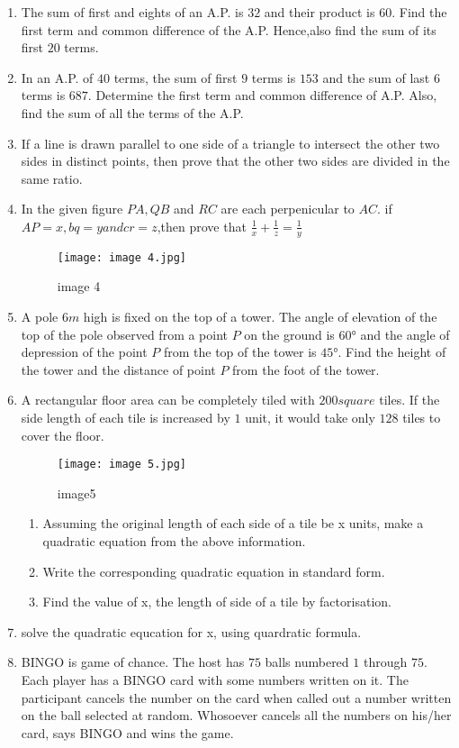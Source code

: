 \documentclass{article}
\begin{document}
\begin{enumerate}
\item  The sum of first and eights of an A.P. is $32$ and their product is $60$. Find the first term  and common difference of the A.P. Hence,also find the sum of its first $20$ terms.
\item In an A.P. of $40$ terms, the sum of first $9$ terms is $153$ and the sum of last $6$ terms is $687$. Determine the first term and common difference of A.P. Also, find the sum of all the terms of the A.P.
\item If a line is drawn parallel to one side of a triangle to intersect the other two sides in distinct points, then prove that the other two sides are divided in the same ratio.
\item In the given figure $PA,QB$ and $RC$ are each perpenicular to $AC$. if $AP = x,bq=y and cr =z$,then prove that $\frac{1}{x} + \frac{1}{z} = \frac{1}{y}$                                               
\begin{figure}[!ht]
\centering
\texttt{[image: image 4.jpg]}
\label{fig:image 4}
\caption{image 4}
\end{figure}
\newpage
\item A pole $6m$ high is fixed on the top of a tower. The angle of elevation of the top of the pole observed from a point $P$ on the ground is $60°$ and the angle of depression of the point $P$ from the top of the tower is $45°$. Find the height of the tower and the distance of point $P$ from the foot of the tower.
\item A rectangular floor area can be completely tiled with $200square$ tiles. If the side length of each tile is increased by $1$ unit, it would take only $128$ tiles to cover the floor.

\begin{figure}[!ht]
\centering
\texttt{[image: image 5.jpg]}
\label{fig:image5}
	\caption{image5} 
\end{figure}
\begin{enumerate}
\item Assuming the original length of each side of a tile be x units, make a quadratic equation from the above information.\\
\item Write the corresponding quadratic equation in standard form.\\
\item Find the value of x, the length of side of a tile by factorisation.
\end{enumerate}
\item solve the quadratic equcation for x, using quardratic formula.
\newpage
\item BINGO is game of chance. The host has $75$ balls numbered $1$ through $75$. Each player has a BINGO card with some numbers written on it.
The participant cancels the number on the card when called out a number written on the ball selected at random. Whosoever cancels all the numbers on his/her card, says BINGO and wins the game.


\end{enumerate}
\end{document}
